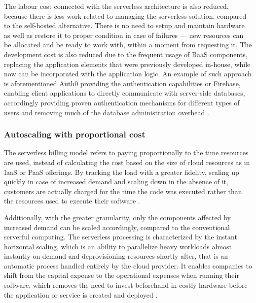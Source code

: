The labour cost connected with the serverless architecture is also reduced, because there is less work related to managing the serverless solution, compared to the self-hosted alternative. There is no need to setup and maintain hardware as well as restore it to proper condition in case of failures --- new resources can be allocated and be ready to work with, within a moment from requesting it. The development cost is also reduced due to the frequent usage of BaaS components, replacing the application elements that were previously developed in-house, while now can be incorporated with the application logic. An example of such approach is aforementioned Auth0 providing the authentication capabilities or Firebase, enabling client applications to directly communicate with server-side databases, accordingly providing proven authentication mechanisms for different types of users and removing much of the database administration overhead \cite{MartinFowlerServerless}.

\subsubsection{Autoscaling with proportional cost} \label{chapter:serverless-autoscaling-with-proportional-cost}

The serverless billing model refers to paying proportionally to the time resources are used, instead of calculating the cost based on the size of cloud resources as in IaaS or PaaS offerings. By tracking the load with a greater fidelity, scaling up quickly in case of increased demand and scaling down in the absence of it, customers are actually charged for the time the code was executed rather than the resources used to execute their software \cite{BerkeleyServerless}.

Additionally, with the greater granularity, only the components affected by increased demand can be scaled accordingly, compared to the conventional serverful computing. The serverless processing is characterized by the instant horizontal scaling, which is an ability to parallelize heavy workloads almost instantly on demand and deprovisioning resources shortly after, that is an automatic process handled entirely by the cloud provider. It enables companies to shift from the capital expense to the operational expenses when running their software, which removes the need to invest beforehand in costly hardware before the application or service is created and deployed \cite{LeveragingServerlessCloudComputingArchitectures}.

